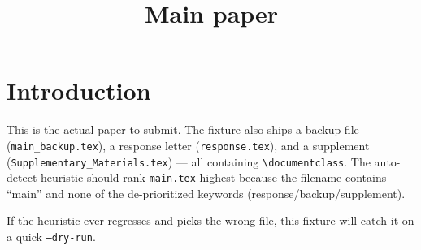 \documentclass{article}
\title{Main paper}
\begin{document}
\maketitle

\section{Introduction}
This is the actual paper to submit. The fixture also ships a backup file
(\texttt{main\_backup.tex}), a response letter (\texttt{response.tex}),
and a supplement (\texttt{Supplementary\_Materials.tex}) — all containing
\verb|\documentclass|. The auto-detect heuristic should rank
\texttt{main.tex} highest because the filename contains ``main'' and none
of the de-prioritized keywords (response/backup/supplement).

If the heuristic ever regresses and picks the wrong file, this fixture
will catch it on a quick \texttt{--dry-run}.
\end{document}
